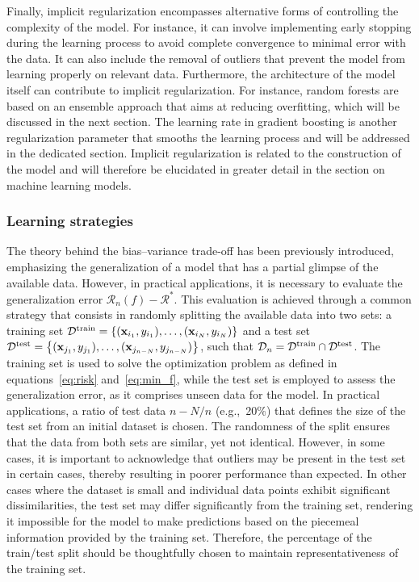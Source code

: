 \documentclass[main]{subfiles}
\begin{document}
Finally, implicit regularization encompasses alternative forms of controlling the complexity of the model. For instance, it can involve implementing early stopping during the learning process to avoid complete convergence to minimal error with the data. It can also include the removal of outliers that prevent the model from learning properly on relevant data. Furthermore, the architecture of the model itself can contribute to implicit regularization. For instance, random forests are based on an ensemble approach that aims at reducing overfitting, which will be discussed in the next section. The learning rate in gradient boosting is another regularization parameter that smooths the learning process and will be addressed in the dedicated section. Implicit regularization is related to the construction of the model and will therefore be elucidated in greater detail in the section on machine learning models.

\subsubsection{Learning strategies}

The theory behind the bias--variance trade-off has been previously introduced, emphasizing the generalization of a model that has a partial glimpse of the available data. However, in practical applications, it is necessary to evaluate the generalization error $\mathcal{R}_n(f)-\mathcal{R}^*$. This evaluation is achieved through a common strategy that consists in randomly splitting the available data into two sets: a training set $\mathcal{D}^{\text{train}}=\left\{{(\mathbf{x}_{i_1},y_{i_1}),\ldots,(\mathbf{x}_{i_N},y_{i_N})}\right\}$ and a test set $\mathcal{D}^{\text{test}}=\left\{(\mathbf{x}_{j_1},y_{j_1}),\ldots,(\mathbf{x}_{j_{n-N}},y_{j_{n-N}})\right\}$, such that $\mathcal{D}_n = \mathcal{D}^{\text{train}} \cap \mathcal{D}^{\text{test}}$. The training set is used to solve the optimization problem as defined in equations~\ref{eq:risk} and~\ref{eq:min_f}, while the test set is employed to assess the generalization error, as it comprises unseen data for the model. In practical applications, a ratio of test data $n-N/n$ (e.g.,\ {20\%}) that defines the size of the test set from an initial dataset is chosen. The randomness of the split ensures that the data from both sets are similar, yet not identical. However, in some cases, it is important to acknowledge that outliers may be present in the test set in certain cases, thereby resulting in poorer performance than expected. In other cases where the dataset is small and individual data points exhibit significant dissimilarities, the test set may differ significantly from the training set, rendering it impossible for the model to make predictions based on the piecemeal information provided by the training set. Therefore, the percentage of the train/test split should be thoughtfully chosen to maintain representativeness of the training set.
\end{document}
